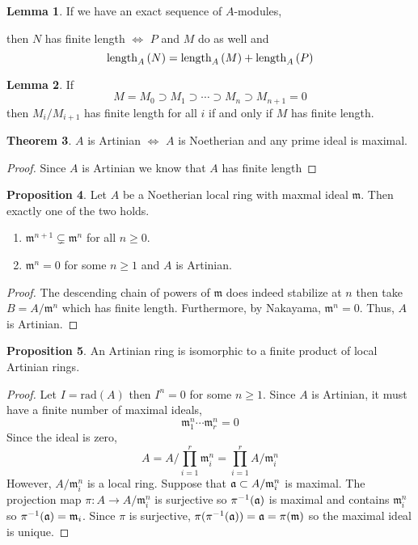 \documentclass[12pt]{article}
\newcommand{\rad}[1]{\mathrm{rad}\left( #1 \right)}
\newcommand{\m}{\mathfrak{m}}
\theoremstyle{remark}
\theoremstyle{definition}
\newtheorem{theorem}{Theorem}[section]
\newtheorem{lemma}[theorem]{Lemma}
\newtheorem{proposition}[theorem]{Proposition}
\begin{document}
\begin{lemma}
If we have an exact sequence of $A$-modules,
\begin{center}
\end{center} 
then $N$ has finite length $\iff$ $P$ and $M$ do as well and
\[ \mathrm{length}_{A}\left(N\right) = \mathrm{length}_{A}\left(M\right) + \mathrm{length}_{A}\left(P\right)\] 
\end{lemma}

\begin{lemma}
If 
\[ M = M_0 \supset M_1 \supset \cdots \supset M_n \supset M_{n+1} = 0 \]
then $M_i / M_{i + 1}$ has finite length for all $i$ if and only if $M$ has finite length.
\end{lemma}

\begin{theorem}
$A$ is Artinian $\iff$ $A$ is Noetherian and any prime ideal is maximal. 
\end{theorem}

\begin{proof}
Since $A$ is Artinian we know that $A$ has finite length
\end{proof}


\begin{proposition}
Let $A$ be a Noetherian local ring with maxmal ideal $\m$. Then exactly one of the two holds.
\begin{enumerate}
\item $\m^{n+1} \subsetneq \m^{n}$ for all $n \ge 0$.
\item $\m^n = 0$ for some $n \ge 1$ and $A$ is Artinian.
\end{enumerate}
\end{proposition}

\begin{proof}
The descending chain of powers of $\m$ does indeed stabilize at $n$ then take $B = A / \m^n$ which has finite length. Furthermore, by Nakayama, $\m^n = 0$. Thus, $A$ is Artinian.
\end{proof}

\begin{proposition}
An Artinian ring is isomorphic to a finite product of local Artinian rings.
\end{proposition}

\begin{proof}
Let $I = \rad{A}$ then $I^n = 0$ for some $n \ge 1$. Since $A$ is Artinian, it must have a finite number of maximal ideals,
\[ \m_1^n \cdots \m_r^n = 0 \]
Since the ideal is zero,
\[ A = A / \prod_{i = 1}^r \m_i^n = \prod_{i = 1}^r A / \m_i^n \]
However, $A / \m_i^n$ is a local ring. Suppose that $\a \subset A / \m_i^n$ is maximal. The projection map $\pi : A \to A / \m_i^n$ is surjective so $\pi^{-1}(\mathfrak{a})$ is maximal and contains $\m_i^n$ so $\pi^{-1}(\a) = \m_i$. Since $\pi$ is surjective, $\pi(\pi^{-1}(\a)) = \a = \pi(\m)$ so the maximal ideal is unique. 
\end{proof}
\end{document}
